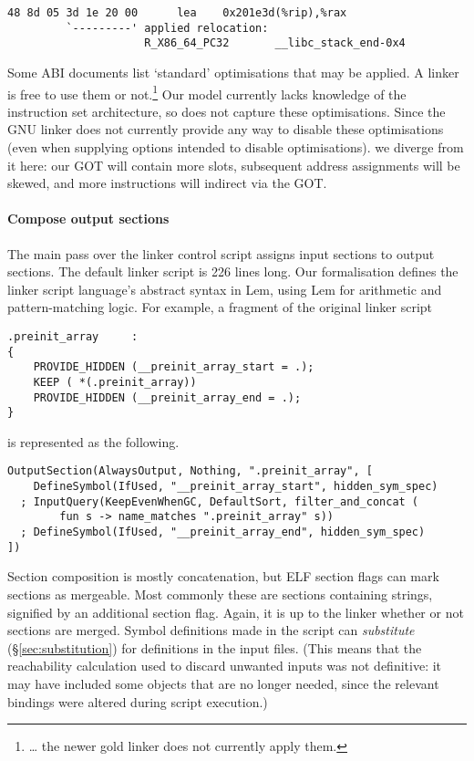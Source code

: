 \documentclass[preprint,10pt]{sigplanconf-pldi16}
\begin{document}
\begin{lstlisting}[basicstyle=\footnotesize\ttfamily,columns=fixed,language=plain]
48 8d 05 3d 1e 20 00      lea    0x201e3d(%rip),%rax
         `---------' applied relocation:
                     R_X86_64_PC32       __libc_stack_end-0x4
\end{lstlisting}

Some ABI documents list `standard' optimisations that may be applied.
A linker is free to use them or not.\footnote{\ldots{} the newer \textsf{gold} linker 
does not currently apply them.}
Our model currently lacks knowledge of the instruction set architecture, so does not capture these optimisations.
Since the GNU linker does not currently provide any way to disable these optimisations
(even when supplying options intended to disable optimisations).
we diverge from it here: our GOT will contain more slots,
subsequent address assignments will be skewed,
and more instructions will indirect via the GOT.

\paragraph{Compose output sections} The main pass over the linker control script
assigns input sections to output sections.
The default linker script is 226 lines long.
Our formalisation defines the linker script language's abstract syntax in Lem,
using Lem for arithmetic and pattern-matching logic.
For example, a fragment of the original linker script

\begin{lstlisting}[basicstyle=\scriptsize\sffamily,language=plain]
.preinit_array     :
{
    PROVIDE_HIDDEN (__preinit_array_start = .);
    KEEP ( *(.preinit_array))
    PROVIDE_HIDDEN (__preinit_array_end = .);
}
\end{lstlisting}
  
\noindent{} is represented as the following.

\begin{lstlisting}[basicstyle=\scriptsize\sffamily,language=plain]
OutputSection(AlwaysOutput, Nothing, ".preinit_array", [
    DefineSymbol(IfUsed, "__preinit_array_start", hidden_sym_spec)
  ; InputQuery(KeepEvenWhenGC, DefaultSort, filter_and_concat (
        fun s -> name_matches ".preinit_array" s))
  ; DefineSymbol(IfUsed, "__preinit_array_end", hidden_sym_spec)
])
\end{lstlisting}

Section composition is mostly concatenation, but ELF section flags can mark sections as mergeable.
Most commonly these are sections containing strings, signified by an additional section flag.
Again, it is up to the linker whether or not sections are merged.
Symbol definitions made in the script can \emph{substitute} (\S\ref{sec:substitution}) for definitions 
in the input files. (This means that the reachability calculation
used to discard unwanted inputs was not definitive: it may have included
some objects that are no longer needed, since the relevant bindings were altered during
script execution.)
\end{document}
